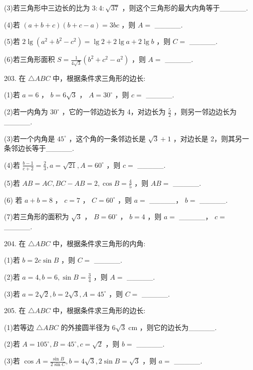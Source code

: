 \documentclass[10pt]{article}
\begin{document}
(3)若三角形中三边长的比为 \(3 : 4 : \sqrt{37}\) ，则这个三角形的最大内角等于\_\_\_\_\_.

(4)若 \(\left( {a + b + c}\right) \left( {b + c - a}\right)  = {3bc}\) ，则 \(A =\) \_\_\_\_\_.

(5)若 \({2\lg \left( {{a}^{2} + {b}^{2} - {c}^{2}}\right) } = {\lg 2} + {2\lg a} + 2\lg b\) ，则 \(C =\) \_\_\_\_\_.

(6)若三角形面积 \(S = \frac{1}{4\sqrt{3}}\left( {{b}^{2} + {c}^{2} - {a}^{2}}\right)\) ，则 \(A =\) \_\_\_\_\_.

203. 在 \(\bigtriangleup  {ABC}\) 中，根据条件求三角形的边长:

(1)若 \(a = 6\) ， \(b = 6\sqrt{3}\) ， \(A = {30}^{ \circ  }\) ，则 \(c =\) \_\_\_\_\_.

(2)若一内角为 \({30}^{ \circ  }\) ，它的一邻边边长为 4，对边长为 \(\frac{5}{2}\) ，则另一邻边边长为\_\_\_\_\_.

(3)若一个内角是 \({45}^{ \circ  }\) ，这个角的一条邻边长是 \(\sqrt{3} + 1\) ，对边长是 2，则其另一条邻边长等于\_\_\_\_\_.

(4)若 \(\frac{b - 1}{c + 2} = \frac{2}{3},a = \sqrt{21},A = {60}^{ \circ  }\) ，则 \(c =\) \_\_\_\_\_.

(5)若 \({AB} = {AC},{BC} - {AB} = 2,\cos B = \frac{4}{5}\) ，则 \({AB} =\) \_\_\_\_\_.

(6) 若 \(a + b = 8\) ， \(c = 7\) ， \(C = {60}^{ \circ  }\) ，则 \(a =\) \_\_\_\_\_， \(b =\) \_\_\_\_\_.

(7)若三角形的面积为 \(\sqrt{3}\) ， \(B = {60}^{ \circ  }\) ， \(b = 4\) ，则 \(a =\) \_\_\_\_\_， \(c =\) \_\_\_\_\_.

204. 在 \(\bigtriangleup  {ABC}\) 中，根据条件求三角形的内角:

(1)若 \(b = {2c}\sin B\) ，则 \(C =\) \_\_\_\_\_.

(2)若 \(a = 4,b = 6,\sin B = \frac{3}{4}\) ，则 \(A =\) \_\_\_\_\_.

(3)若 \(a = 2\sqrt{2},b = 2\sqrt{3},A = {45}^{ \circ  }\) ，则 \(C =\) \_\_\_\_\_.

205. 在 \(\bigtriangleup  {ABC}\) 中，根据条件求三角形的边长:

(1)若等边 \(\bigtriangleup  {ABC}\) 的外接圆半径为 \(6\sqrt{3}\mathrm{\;{cm}}\) ，则它的边长为\_\_\_\_\_.

(2)若 \(A = {105}^{ \circ  },B = {45}^{ \circ  },c = \sqrt{2}\) ，则 \(b =\) \_\_\_\_\_.

(3)若 \(\cos A = \frac{\sin B}{2\sin C},b = 4\sqrt{3},2\sin B = \sqrt{3}\) ，则 \(a =\) \_\_\_\_\_.
\end{document}
